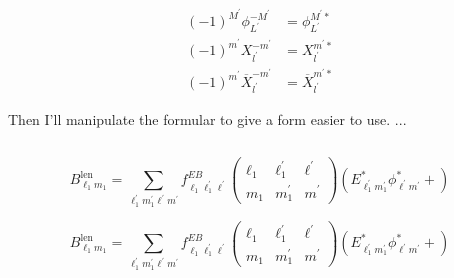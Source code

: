 \documentclass[12pt]{article}
\begin{document}
\begin{align}
  (-1)^{M^{\prime}}  \phi_{L^{\prime}}^{-M^{\prime}} & =  \phi_{L^{\prime}}^{M^{\prime} {*}}\\
  (-1)^{m^{\prime}} X_{l^{\prime}}^{-m^{\prime}} & =  X_{l^{\prime}}^{m^{\prime} {*}}\\
  (-1)^{m^{\prime}}\overline{X}_{l^{\prime}}^{-m^{\prime}}  & = \overline{X}_{l^{\prime}}^{m^{\prime} {*}}   
\end{align}


Then I'll manipulate the formular to give a form easier to use.
...



\begin{equation}
  
\end{equation}

\begin{equation}
  B_{\ell_{1} m_{1}}^{\mathrm{len}}=\sum_{\ell_{1}^{\prime} m_{1}^{\prime} \ell^{\prime} m^{\prime}} f_{\ell_{1} \ell_{1}^{\prime} \ell^{\prime}}^{E B}\left(\begin{array}{ccc}{\ell_{1}} & {\ell_{1}^{\prime}} & {\ell^{\prime}} \\ {m_{1}} & {m_{1}^{\prime}} & {m}^{\prime}\end{array}\right) \left( E_{\ell_{1}^{\prime} m_{1}^{\prime}}^{*} \phi_{\ell^{\prime} m^{\prime}}^{*}+ \right)
\end{equation}


\begin{equation}
  B_{\ell_{1} m_{1}}^{\mathrm{len}}=\sum_{\ell_{1}^{\prime} m_{1}^{\prime} \ell^{\prime} m^{\prime}} f_{\ell_{1} \ell_{1}^{\prime} \ell^{\prime}}^{E B}\left(\begin{array}{ccc}{\ell_{1}} & {\ell_{1}^{\prime}} & {\ell^{\prime}} \\ {m_{1}} & {m_{1}^{\prime}} & {m}^{\prime}\end{array}\right) \left( E_{\ell_{1}^{\prime} m_{1}^{\prime}}^{*} \phi_{\ell^{\prime} m^{\prime}}^{*}+ \right)
\end{equation}
\end{document}

